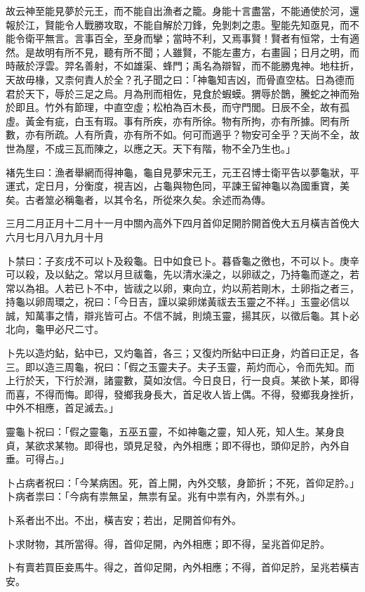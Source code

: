 \begin{pinyinscope}
故云神至能見夢於元王，而不能自出漁者之籠。身能十言盡當，不能通使於河，還報於江，賢能令人戰勝攻取，不能自解於刀鋒，免剝刺之患。聖能先知亟見，而不能令衛平無言。言事百全，至身而攣；當時不利，又焉事賢！賢者有恒常，士有適然。是故明有所不見，聽有所不聞；人雖賢，不能左畫方，右畫圓；日月之明，而時蔽於浮雲。羿名善射，不如雄渠、蜂門；禹名為辯智，而不能勝鬼神。地柱折，天故毋椽，又柰何責人於全？孔子聞之曰：「神龜知吉凶，而骨直空枯。日為德而君於天下，辱於三足之烏。月為刑而相佐，見食於蝦蟆。猬辱於鵲，騰蛇之神而殆於即且。竹外有節理，中直空虛；松柏為百木長，而守門閭。日辰不全，故有孤虛。黃金有疵，白玉有瑕。事有所疾，亦有所徐。物有所拘，亦有所據。罔有所數，亦有所疏。人有所貴，亦有所不如。何可而適乎？物安可全乎？天尚不全，故世為屋，不成三瓦而陳之，以應之天。天下有階，物不全乃生也。」

褚先生曰：漁者舉網而得神龜，龜自見夢宋元王，元王召博士衛平告以夢龜狀，平運式，定日月，分衡度，視吉凶，占龜與物色同，平諫王留神龜以為國重寶，美矣。古者筮必稱龜者，以其令名，所從來久矣。余述而為傳。

三月二月正月十二月十一月中關內高外下四月首仰足開肣開首俛大五月橫吉首俛大六月七月八月九月十月

卜禁曰：子亥戌不可以卜及殺龜。日中如食已卜。暮昏龜之徼也，不可以卜。庚辛可以殺，及以鉆之。常以月旦祓龜，先以清水澡之，以卵祓之，乃持龜而遂之，若常以為祖。人若已卜不中，皆祓之以卵，東向立，灼以荊若剛木，土卵指之者三，持龜以卵周環之，祝曰：「今日吉，謹以粱卵焍黃祓去玉靈之不祥。」玉靈必信以誠，知萬事之情，辯兆皆可占。不信不誠，則燒玉靈，揚其灰，以徵后龜。其卜必北向，龜甲必尺二寸。

卜先以造灼鉆，鉆中已，又灼龜首，各三；又復灼所鉆中曰正身，灼首曰正足，各三。即以造三周龜，祝曰：「假之玉靈夫子。夫子玉靈，荊灼而心，令而先知。而上行於天，下行於淵，諸靈數，莫如汝信。今日良日，行一良貞。某欲卜某，即得而喜，不得而悔。即得，發鄉我身長大，首足收人皆上偶。不得，發鄉我身挫折，中外不相應，首足滅去。」

靈龜卜祝曰：「假之靈龜，五巫五靈，不如神龜之靈，知人死，知人生。某身良貞，某欲求某物。即得也，頭見足發，內外相應；即不得也，頭仰足肣，內外自垂。可得占。」

卜占病者祝曰：「今某病困。死，首上開，內外交駭，身節折；不死，首仰足肣。」卜病者祟曰：「今病有祟無呈，無祟有呈。兆有中祟有內，外祟有外。」

卜系者出不出。不出，橫吉安；若出，足開首仰有外。

卜求財物，其所當得。得，首仰足開，內外相應；即不得，呈兆首仰足肣。

卜有賣若買臣妾馬牛。得之，首仰足開，內外相應；不得，首仰足肣，呈兆若橫吉安。


\end{pinyinscope}
